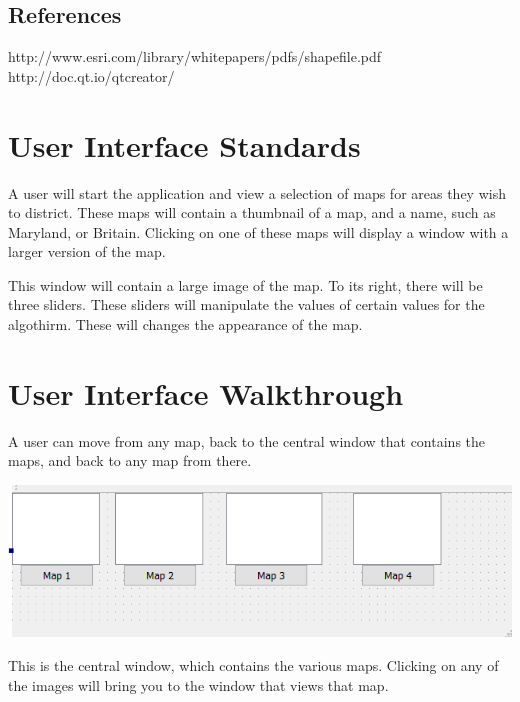 \documentclass{article}
\begin{document}
\vspace{2.5mm}

\subsection{References}

http://www.esri.com/library/whitepapers/pdfs/shapefile.pdf
http://doc.qt.io/qtcreator/

\vspace{2.5mm}

\section{User Interface Standards}

A user will start the application and view a selection of maps for areas they wish to district.  These maps will contain a thumbnail of a map, and a name, such as Maryland, or Britain.  Clicking on one of these maps will display a window with a larger version of the map.   

This window will contain a large image of the map.  To its right,  there will be three sliders.  These sliders will manipulate the values of certain values for the algothirm.  These will changes the appearance of the map.

\vspace{2.5mm}

\section{User Interface Walkthrough}
A user can move from any map, back to the central window that contains the maps, and back to any map from there.

\vspace{10mm}
	
\hspace*{5mm}   
\includegraphics[scale=1]{mainWin.png}

\vspace{5mm}


This is the central window, which contains the various maps.  Clicking on any of the images will bring you to the window that views that map.
\end{document}
